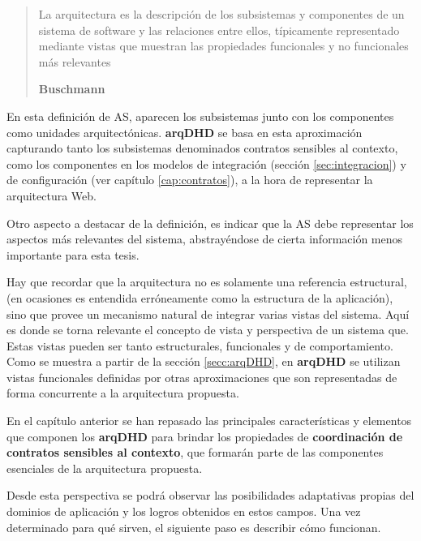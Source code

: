 \begin{quote}

La arquitectura es la descripción de los subsistemas y componentes de
un sistema de software y las relaciones entre ellos, típicamente representado mediante vistas que muestran las propiedades funcionales y no funcionales más relevantes  

\begin{flushright} \textbf{Buschmann} \cite{arqModulos} \end{flushright}

\end{quote}



En esta definición de AS, aparecen los subsistemas junto con los componentes
como unidades arquitectónicas. \textbf{arqDHD} se basa en esta aproximación capturando
tanto los subsistemas denominados contratos sensibles al contexto, como los
componentes
en los modelos de integración (sección \ref{sec:integracion}) y de configuración (ver capítulo \ref{cap:contratos}), a la hora de representar la arquitectura Web.

Otro aspecto a destacar de la definición, es indicar que la AS debe representar
los aspectos más relevantes del sistema, abstrayéndose de cierta información
menos importante para esta tesis.

Hay que recordar que la arquitectura no es solamente una referencia estructural, (en ocasiones es entendida erróneamente como la estructura de la aplicación), sino que provee
un mecanismo natural de integrar varias vistas del sistema. Aquí  es donde se torna relevante el concepto de vista y perspectiva de un sistema que.   Estas vistas pueden ser tanto estructurales, funcionales y de comportamiento. Como se muestra a partir de la sección \ref{secc:arqDHD}, en \textbf{arqDHD} se utilizan vistas funcionales definidas por otras aproximaciones que son representadas de forma concurrente a la arquitectura propuesta. 

En el capítulo anterior se han repasado las principales características y elementos que componen los \textbf{arqDHD} para brindar los propiedades de \textbf{coordinación de contratos sensibles al contexto}, que formarán parte de las componentes esenciales de la arquitectura propuesta.

Desde esta perspectiva se podrá observar las posibilidades adaptativas propias del dominios de aplicación y los logros obtenidos en estos campos. Una vez determinado para qué sirven, el siguiente paso es describir cómo funcionan. 

